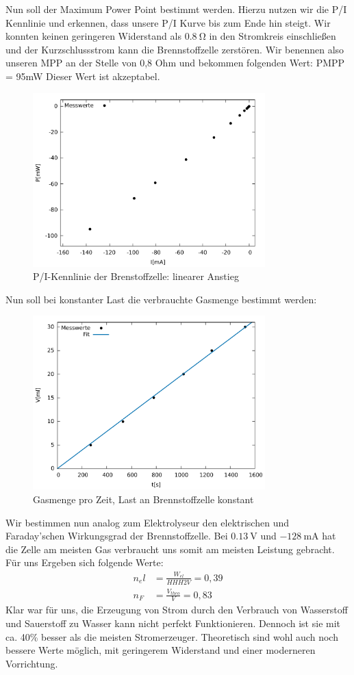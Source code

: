 Nun soll der Maximum Power Point bestimmt werden. Hierzu nutzen wir die P/I Kennlinie und erkennen, dass unsere P/I Kurve bis zum Ende hin steigt. Wir konnten keinen geringeren Widerstand als $\SI{0,8}{\ohm}$  in den Stromkreis einschließen und der Kurzschlussstrom kann die Brennstoffzelle zerstören.
Wir benennen also unseren MPP an der Stelle von 0,8 Ohm und bekommen folgenden Wert: PMPP = 95mW 
Dieser Wert ist akzeptabel.
\begin{figure}[htbp]
	\centering
	\includegraphics[width=0.8\textwidth]{mess/aufg11.pdf}
	\caption{P/I-Kennlinie der Brenstoffzelle: linearer Anstieg}
	\label{a11}
\end{figure}

Nun soll bei konstanter Last die verbrauchte Gasmenge bestimmt werden:
\begin{figure}[htbp]
	\centering
	\includegraphics[width=0.8\textwidth]{mess/aufg12.pdf}
	\caption{Gasmenge pro Zeit, Last an Brennstoffzelle konstant}
	\label{a12}
\end{figure}
Wir bestimmen nun analog zum Elektrolyseur den elektrischen und Faraday’schen Wirkungsgrad der Brennstoffzelle.
Bei $\SI{0.13}{\volt}$ und $\SI{-128}{\milli \ampere}$ hat die Zelle am meisten Gas verbraucht uns somit am meisten Leistung gebracht. Für uns Ergeben sich folgende Werte:
\begin{align*}
n_el &= \frac{W_{el}}{HHH2V}=0,39 \\
n_F &= \frac{V_{theo}}{V}=0,83
\end{align*}
Klar war für uns, die Erzeugung von Strom durch den Verbrauch von Wasserstoff und Sauerstoff zu Wasser kann nicht perfekt Funktionieren.
Dennoch ist sie mit ca. 40\% besser als die meisten Stromerzeuger.
Theoretisch sind wohl auch noch bessere Werte möglich, mit geringerem Widerstand und einer moderneren Vorrichtung.
